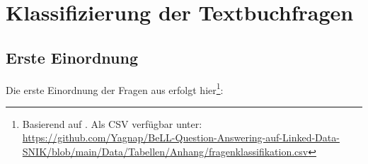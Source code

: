 \chapter{Klassifizierung der Textbuchfragen}\label{ch:klassifizierungtextbuchfragen}

\section{Erste Einordnung}\label{sub:firsteval}

Die erste Einordnung der Fragen aus \citet{bb} erfolgt hier\footnote{Basierend auf \citet{arneba}.
Als CSV verfügbar unter:\\\url{https://github.com/Yagnap/BeLL-Question-Answering-auf-Linked-Data-SNIK/blob/main/Data/Tabellen/Anhang/fragenklassifikation.csv}}:

